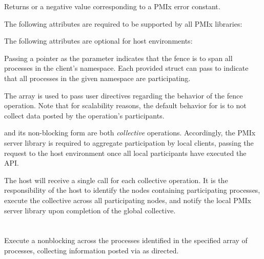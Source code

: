Returns  or a negative value corresponding to a PMIx error constant.

\reqattrstart
The following attributes are required to be supported by all \ac{PMIx} libraries:


\reqattrend

\optattrstart
The following attributes are optional for host environments:


\optattrend

\descr

Passing a  pointer as the  parameter indicates that the fence is to span all processes in the client's namespace.
Each provided  struct can pass  to indicate that all processes in the given namespace are participating.

The  array is used to pass user directives regarding the behavior of the fence operation. Note that for scalability reasons, the default behavior for  is to not collect data posted by the operation's participants.

\adviceimplstart
{} and its non-blocking form are both \emph{collective} operations. Accordingly, the \ac{PMIx} server library is required to aggregate participation by local clients, passing the request to the host environment once all local participants have executed the \ac{API}.
\adviceimplend

\advicermstart
The host will receive a single call for each collective operation. It is the responsibility of the host to identify the nodes containing participating processes, execute the collective across all participating nodes, and notify the local \ac{PMIx} server library upon completion of the global collective.
\advicermend

\section{}

\summary

Execute a nonblocking  across the processes identified in the specified array of processes, collecting information posted via  as directed.

\format

